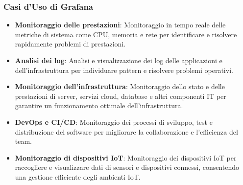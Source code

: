 \subsubsection{Casi d'Uso di Grafana}
\begin{itemize}
    \item \textbf{Monitoraggio delle prestazioni}: Monitoraggio in tempo reale delle metriche di sistema come CPU, memoria e rete per identificare e risolvere rapidamente problemi di prestazioni.
    
    \item \textbf{Analisi dei log}: Analisi e visualizzazione dei log delle applicazioni e dell'infrastruttura per individuare pattern e risolvere problemi operativi.
    
    \item \textbf{Monitoraggio dell'infrastruttura}: Monitoraggio dello stato e delle prestazioni di server, servizi cloud, database e altri componenti IT per garantire un funzionamento ottimale dell'infrastruttura.
    
    \item \textbf{DevOps e CI/CD}: Monitoraggio dei processi di sviluppo, test e distribuzione del software per migliorare la collaborazione e l'efficienza del team.
    
    \item \textbf{Monitoraggio di dispositivi IoT}: Monitoraggio dei dispositivi IoT per raccogliere e visualizzare dati di sensori e dispositivi connessi, consentendo una gestione efficiente degli ambienti IoT.
\end{itemize}